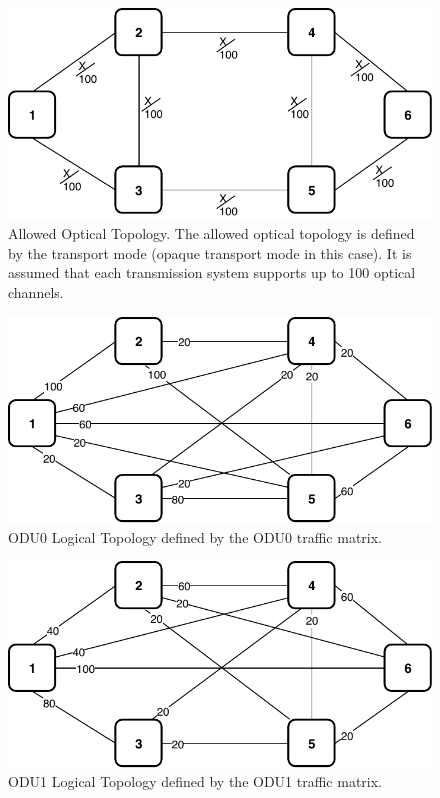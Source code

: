 \begin{figure}[h!]
\centering
\includegraphics[width=12cm]{sdf/ilp/opaque_protection/figures/allowed_optical_topology}
\caption{Allowed Optical Topology. The allowed optical topology is defined by the transport mode (opaque transport mode in this case). It is assumed that each transmission system supports up to 100 optical channels.}
\label{allowed_optical_protectionhigh}
\end{figure}
\newpage
\begin{figure}[h!]
\centering
\includegraphics[width=12cm]{sdf/ilp/opaque_protection/figures/logical_topology_ODU0_high}
\caption{ODU0 Logical Topology defined by the ODU0 traffic matrix.}
\label{logical_ODU0_protectionhigh}
\end{figure}

\begin{figure}[h!]
\centering
\includegraphics[width=12cm]{sdf/ilp/opaque_protection/figures/logical_topology_ODU1_high}
\caption{ODU1 Logical Topology defined by the ODU1 traffic matrix.}
\label{logical_ODU1_protectionhigh}
\end{figure}

